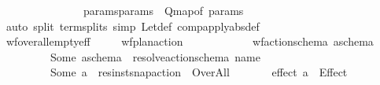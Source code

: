 \begin{isabellebody}
\ \ \ \ \ \ \ \ \ \ \ \ \ \ \ params{}{\isacharequal}{\kern0pt}{\isachardoublequoteopen}params{\isachardoublequoteclose}\ \ Q{}{\isacharequal}{\kern0pt}{\isachardoublequoteopen}{\isacharparenleft}{\kern0pt}map{\isacharunderscore}{\kern0pt}of\ params{\isacharparenright}{\kern0pt}{\isachardoublequoteclose}{\isacharbrackright}{\kern0pt}\isanewline
\ \ \ \ \ \ \isamarkupfalse%
\ {\isacharparenleft}{\kern0pt}auto\ split{\isacharcolon}{\kern0pt}\ term{\isachardot}{\kern0pt}splits\ simp{\isacharcolon}{\kern0pt}\ Let{\isacharunderscore}{\kern0pt}def\ comp{\isacharunderscore}{\kern0pt}apply{\isacharbrackleft}{\kern0pt}abs{\isacharunderscore}{\kern0pt}def{\isacharbrackright}{\kern0pt}{\isacharparenright}{\kern0pt}\isanewline
\ \ \ \ \ \ \isamarkupfalse%
\ \isanewline
\ \ \isamarkupfalse%
%
\endisatagproof
{\isafoldproof}%
%
\isadelimproof
\isanewline
%
\endisadelimproof
\isanewline
\ \ \isamarkupfalse%
\ wf{\isacharunderscore}{\kern0pt}over{\isacharunderscore}{\kern0pt}all{\isacharunderscore}{\kern0pt}empty{\isacharunderscore}{\kern0pt}eff{\isacharcolon}{\kern0pt}\isanewline
\ \ \ \ \ {\isachardoublequoteopen}wf{\isacharunderscore}{\kern0pt}plan{\isacharunderscore}{\kern0pt}action\ {\isasympi}\ {\isachardoublequoteclose}\ \isanewline
\ \ \ \ \ \ \ \ \ {\isachardoublequoteopen}wf{\isacharunderscore}{\kern0pt}action{\isacharunderscore}{\kern0pt}schema\ a\isactrlsub s\isactrlsub c\isactrlsub h\isactrlsub e\isactrlsub m\isactrlsub a{\isachardoublequoteclose}\isanewline
\ \ \ \ \ \ \ \ \ {\isachardoublequoteopen}Some\ a\isactrlsub s\isactrlsub c\isactrlsub h\isactrlsub e\isactrlsub m\isactrlsub a\ {\isacharequal}{\kern0pt}\ resolve{\isacharunderscore}{\kern0pt}action{\isacharunderscore}{\kern0pt}schema\ {\isacharparenleft}{\kern0pt}name\ {\isasympi}{\isacharparenright}{\kern0pt}{\isachardoublequoteclose}\isanewline
\ \ \ \ \ \ \ \ \ {\isachardoublequoteopen}Some\ a\ {\isacharequal}{\kern0pt}\ res{\isacharunderscore}{\kern0pt}inst{\isacharunderscore}{\kern0pt}snap{\isacharunderscore}{\kern0pt}action\ {\isasympi}\ Over{\isacharunderscore}{\kern0pt}All{\isachardoublequoteclose}\isanewline
\ \ \ \ \ \ \ {\isachardoublequoteopen}effect\ a\ {\isacharequal}{\kern0pt}\ Effect\ {\isacharbrackleft}{\kern0pt}{\isacharbrackright}{\kern0pt}\ {\isacharbrackleft}{\kern0pt}{\isacharbrackright}{\kern0pt}{\isachardoublequoteclose}\isanewline
%
\isadelimproof

\end{isabellebody}
